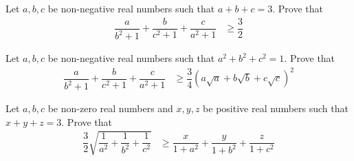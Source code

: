 \documentclass{subfile}
\begin{document}
		\begin{problem}[$2003$, problem $3$]
			Let $a,b,c$ be non-negative real numbers such that $a+b+c=3$. Prove that
				\begin{align*}
					\dfrac{a}{b^{2}+1}+\dfrac{b}{c^{2}+1}+\dfrac{c}{a^{2}+1}
						& \geq \dfrac{3}{2}
				\end{align*}
		\end{problem}
	
		\begin{problem}[$2002$, problem $4$]
			Let $a,b,c$ be non-negative real numbers such that $a^{2}+b^{2}+c^{2}=1$. Prove that
				\begin{align*}
					\dfrac{a}{b^{2}+1}+\dfrac{b}{c^{2}+1}+\dfrac{c}{a^{2}+1}
						& \geq \dfrac{3}{4}\left(a\sqrt{a}+b\sqrt{b}+c\sqrt{c}\right)^{2}
				\end{align*}
		\end{problem}
	
		\begin{problem}[$1999$, problem $3$]
			Let $a,b,c$ be non-zero real numbers and $x,y,z$ be positive real numbers such that $x+y+z=3$. Prove that
				\begin{align*}
					\dfrac{3}{2}\sqrt{\dfrac{1}{a^{2}}+\dfrac{1}{b^{2}}+\dfrac{1}{c^{2}}}
						& \geq \dfrac{x}{1+a^{2}}+\dfrac{y}{1+b^{2}}+\dfrac{z}{1+c^{2}}
				\end{align*}
		\end{problem}
\end{document}
